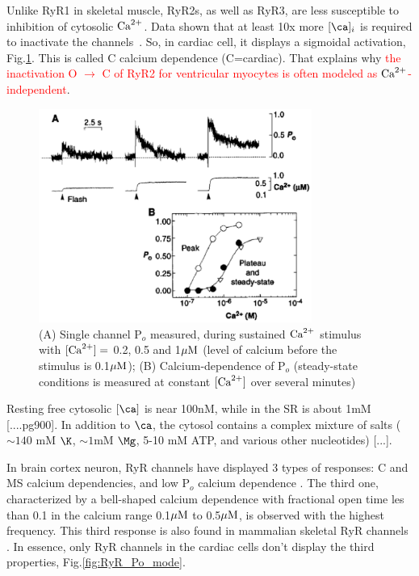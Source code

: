 Unlike RyR1 in skeletal muscle, RyR2s, as well as RyR3, are less susceptible to
inhibition of cytosolic ${\text{Ca}^{2+}}$. Data shown that at least 10x more $[\ca]_i$ is
required to inactivate the channels~\citep{Bhat1997}. So, in cardiac cell, it
displays a sigmoidal activation, Fig.\ref{fig:RyR_Po}. This is called C calcium
dependence (C=cardiac). That explains why \textcolor{red}{the inactivation O
$\rightarrow$ C of RyR2 for ventricular myocytes is often modeled as
${\text{Ca}^{2+}}$-independent}.

\begin{figure}[hbt]
  \centerline{\includegraphics[height=7cm,
    angle=0]{./images/RyR_Po.eps}}
\caption{(A) Single channel P$_o$ measured, during sustained ${\text{Ca}^{2+}}$ stimulus with
$[{\text{Ca}^{2+}}]=$ 0.2, 0.5 and 1${\mu\text{M}}$ (level of calcium before the stimulus is
0.1${\mu\text{M}}$); (B) Calcium-dependence of P$_o$ (steady-state conditions is
measured at constant $[{\text{Ca}^{2+}}]$ over several minutes)\citep{gyorke1993ryr}}
\label{fig:RyR_Po}
\end{figure}


\begin{framed}
  Resting free cytosolic $[\ca]$ is near 100nM, while in the SR is
  about 1mM [....pg900]. In addition to $\ca$, the cytosol contains a
  complex mixture of salts ($\sim 140$ mM $\K$, $\sim 1$mM $\Mg$, 5-10
  mM ATP, and various other nucleotides) [...].
\end{framed}

In brain cortex neuron, RyR channels have displayed 3 types of responses: C and
MS calcium dependencies, and low P$_o$ calcium dependence \citep{marengo1996,
bull2007}. The third one, characterized by a bell-shaped calcium dependence with
fractional open time les than 0.1 in the calcium range 0.1${\mu\text{M}}$ to 0.5${\mu\text{M}}$,
is observed with the highest frequency. This third response is also found in
mammalian skeletal RyR channels \citep{copello1997}. In essence, only RyR
channels in the cardiac cells don't display the third properties,
Fig.\ref{fig:RyR_Po_mode}. 

